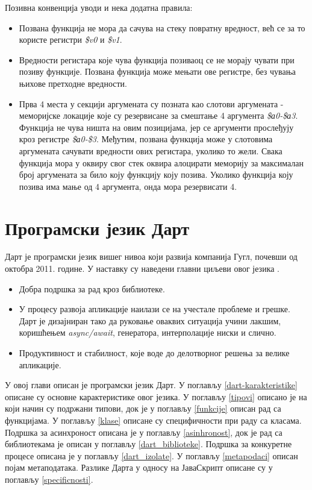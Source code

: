 \documentclass[12pt,oneside]{memoir}
\begin{document}
Позивна конвенција уводи и нека додатна правила:
\begin{itemize}
\item Позвана функција не мора да сачува на стеку повратну вредност, већ се за то користе регистри \textit{\$v0} и \textit{\$v1}.

\item Вредности регистара које чува функција позиваоц се не морају чувати при позиву функције. Позвана функција може мењати ове регистре, без чувања њихове претходне вредности.

\item Прва 4 места у секцији аргумената су позната као слотови аргумената - меморијске локације које су резервисане за смештање 4 аргумента \textit{\$а0-\$а3}. Функција не чува ништа на овим позицијама, јер се аргументи прослеђују кроз регистре \textit{\$а0-\$3}. Међутим, позвана функција може у слотовима аргумената сачувати вредности ових регистара, уколико то жели. Свака функција мора у оквиру свог стек оквира алоцирати меморију за максималан број аргумената за било коју функцију коју позива. Уколико функција коју позива има мање од 4 аргумента, онда мора резервисати 4.
\end{itemize}


\chapter{Програмски језик Дарт}
\label{chp:dart}
Дарт је програмски језик вишег нивоа који развија компанија Гугл, почевши од октобра 2011. године. У наставку су наведени главни циљеви овог језика \cite{dart_lang}.
\begin{itemize}
\item Добра подршка за рад кроз библиотеке.
\item У процесу развоја апликације наилази се на учестале проблеме и грешке. Дарт је дизајниран тако да руковање оваквих ситуација учини лакшим, коришћењем \textit{async/await}, генератора, интерполације ниски и слично.
\item Продуктивност и стабилност, које воде до делотворног решења за велике апликације.
\end{itemize}

У овој глави описан је програмски језик Дарт. У поглављу \ref{dart-karakteristike} описане су основне карактеристике овог језика. У поглављу \ref{tipovi} описано је на који начин су подржани типови, док је у поглављу \ref{funkcije} описан рад са функцијама. У поглављу \ref{klase} описане су специфичности при раду са класама. Подршка за асинхроност описана је у поглављу \ref{asinhronost}, док је рад са библиотекама је описан у поглављу \ref{dart_biblioteke}. Подршка за конкуретне процесе описана је у поглављу \ref{dart_izolate}. У поглављу \ref{metapodaci} описан појам метаподатака. Разлике Дарта у односу на ЈаваСкрипт описане су у поглављу \ref{specificnosti}.
\end{document}
